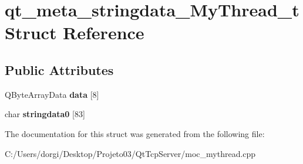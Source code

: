 \hypertarget{structqt__meta__stringdata___my_thread__t}{}\section{qt\+\_\+meta\+\_\+stringdata\+\_\+\+My\+Thread\+\_\+t Struct Reference}
\label{structqt__meta__stringdata___my_thread__t}
\subsection*{Public Attributes}
\begin{DoxyCompactItemize}
\item 
\mbox{\label{structqt__meta__stringdata___my_thread__t_ab5607f1078333a9d42458336e4f735dd}} 
Q\+Byte\+Array\+Data {\bfseries data} \mbox{[}8\mbox{]}
\item 
\mbox{\label{structqt__meta__stringdata___my_thread__t_aa80f739ca8c1b5cfcf28f7f8d8666688}} 
char {\bfseries stringdata0} \mbox{[}83\mbox{]}
\end{DoxyCompactItemize}


The documentation for this struct was generated from the following file\+:\begin{DoxyCompactItemize}
\item 
C\+:/\+Users/dorgi/\+Desktop/\+Projeto03/\+Qt\+Tcp\+Server/moc\+\_\+mythread.\+cpp\end{DoxyCompactItemize}
